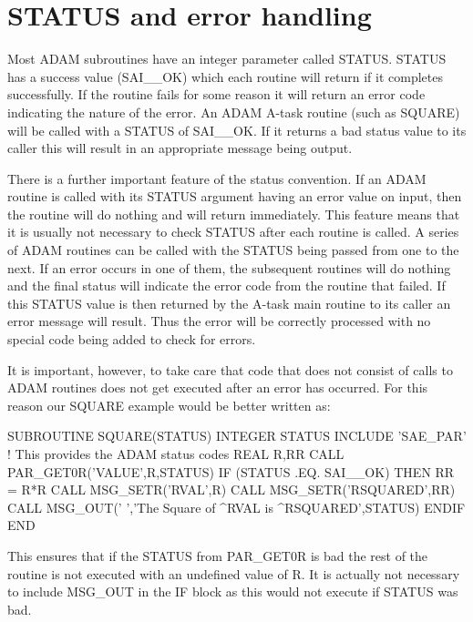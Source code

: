 \documentclass[twoside,11pt,nolof,chapters]{starlink}
\begin{document}
\section{STATUS and error handling}

Most ADAM subroutines have an integer parameter called STATUS. STATUS has a
success value (SAI\_\_OK) which each routine will return if it completes
successfully. If the routine fails for some reason it will return an error code
indicating the nature of the error. An ADAM A-task routine (such as SQUARE)
will be called with a STATUS of SAI\_\_OK. If it returns a bad status value to
its caller this will result in an appropriate message being output.

There is a further important feature of the status convention. If an
ADAM routine is called with its STATUS argument having an error value
on input, then the routine will do nothing and will return immediately.
This feature means that it is usually not necessary to check STATUS
after each routine is called. A series of ADAM routines can be called
with the STATUS being passed from one to the next. If an error occurs in
one of them, the subsequent routines will do nothing and the final status
will indicate the error code from the routine that failed. If this STATUS
value is then returned by the A-task main routine to its caller an error
message will result. Thus the error will be correctly processed with no
special code being added to check for errors.

It is important, however, to take care that code that does not consist of
calls to ADAM routines does not get executed after an error has occurred.
For this reason our SQUARE example would be better written as:

\begin{terminalv}
      SUBROUTINE SQUARE(STATUS)
      INTEGER STATUS
      INCLUDE 'SAE_PAR'  ! This provides the ADAM status codes
      REAL R,RR
      CALL PAR_GET0R('VALUE',R,STATUS)
      IF (STATUS .EQ. SAI__OK) THEN
         RR = R*R
         CALL MSG_SETR('RVAL',R)
         CALL MSG_SETR('RSQUARED',RR)
         CALL MSG_OUT(' ','The Square of ^RVAL is ^RSQUARED',STATUS)
      ENDIF
      END
\end{terminalv}

This ensures that if the STATUS from PAR\_GET0R is bad the rest of the routine
is not executed with an undefined value of R. It is actually not necessary
to include MSG\_OUT in the IF block as this would not execute if STATUS was
bad.
\end{document}
